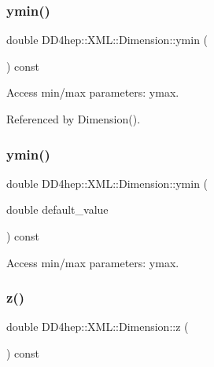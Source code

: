 \subsubsection{\texorpdfstring{ymin()}{ymin()}\hspace{0.1cm}{\footnotesize\ttfamily [1/2]}}
{\footnotesize\ttfamily double D\+D4hep\+::\+X\+M\+L\+::\+Dimension\+::ymin (\begin{DoxyParamCaption}{ }\end{DoxyParamCaption}) const}



Access min/max parameters\+: ymax. 



Referenced by Dimension().

\hypertarget{struct_d_d4hep_1_1_x_m_l_1_1_dimension_a63f99e17a66e6ee065cd3d63b880cdca}{}\label{struct_d_d4hep_1_1_x_m_l_1_1_dimension_a63f99e17a66e6ee065cd3d63b880cdca} 
\subsubsection{\texorpdfstring{ymin()}{ymin()}\hspace{0.1cm}{\footnotesize\ttfamily [2/2]}}
{\footnotesize\ttfamily double D\+D4hep\+::\+X\+M\+L\+::\+Dimension\+::ymin (\begin{DoxyParamCaption}\item[{double}]{default\+\_\+value }\end{DoxyParamCaption}) const}



Access min/max parameters\+: ymax. 

\hypertarget{struct_d_d4hep_1_1_x_m_l_1_1_dimension_ad98d94d3403d936796f65ec4b45f7dbb}{}\label{struct_d_d4hep_1_1_x_m_l_1_1_dimension_ad98d94d3403d936796f65ec4b45f7dbb} 
\subsubsection{\texorpdfstring{z()}{z()}\hspace{0.1cm}{\footnotesize\ttfamily [1/2]}}
{\footnotesize\ttfamily double D\+D4hep\+::\+X\+M\+L\+::\+Dimension\+::z (\begin{DoxyParamCaption}{ }\end{DoxyParamCaption}) const}



